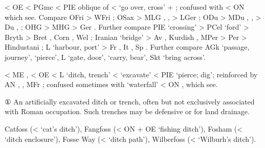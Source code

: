 \documentclass[12pt,letterpaper,oneside,article,draft]{memoir}
\begin{document}
\begin{Lemma}
\begin{Etymology}
	< OE  < PGmc  < PIE  oblique of 
		<  ‘go over, cross’ +  ;
		confused with  < ON  which see.
	Compare
	OFri  > WFri ;
	OSax  > MLG , ,  > LGer ;
	ODu  > MDu , ,  > Du , ;
	OHG  > MHG  > Ger .
	Further compare
	PIE  ‘crossing’ >
		PCel  ‘ford’ > Bryth  > Bret , Corn , Wel ;
		Iranian  ‘bridge’ > Av  ,
			Kurdish  , MPer   > Per \: \!
			> Hindustani \: \! ;
		L  ‘harbour, port’ > Fr , It , Sp .
	Further compare
	AGk   ‘passage, journey’,   ‘pierce’,
	L  ‘gate, door’,  ‘carry, bear’,
	Skt   ‘bring across’.
\end{Etymology}
\begin{Definitions}
\end{Definitions}
\begin{Examples}
\end{Examples}
\end{Lemma}

\begin{Lemma}
\begin{Also}
\end{Also}
\begin{Etymology}
	< ME ,  < OE  < L  ‘ditch, trench’ <  ‘excavate’
		< PIE  ‘pierce; dig’;
		reinforced by AN , , MFr ;
		confused sometimes with  ‘waterfall’ < ON , which see.
\end{Etymology}
\begin{Definitions}
	① An artificially excavated ditch or trench, often but not exclusively associated with Roman occupation.
	Such trenches may be defensive or for land drainage.
\end{Definitions}
\begin{Examples}
	Catfoss (<  ‘cat’s ditch’),
	Fangfoss (< ON  + OE  ‘fishing ditch’),
	Fosham (<  ‘ditch enclosure’),
	Fosse Way (<  ‘ditch path’),
	Wilberfoss (<  ‘Wilburh’s ditch’).
\end{Examples}
\end{Lemma}
\end{document}
